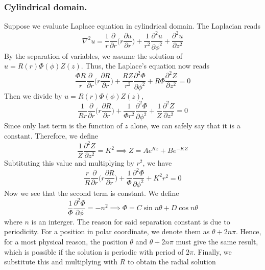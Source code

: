 \documentclass[../main.tex]{subfiles}
\begin{document}
\subsubsection*{Cylindrical domain.} Suppose we evaluate Laplace equation in cylindrical domain. The Laplacian reads
\begin{equation*}
    \nabla^2u= \frac{1}{r}\frac{\partial}{\partial r}\Biggl(r\frac{\partial u}{\partial r}\Biggr)+\frac{1}{r^2} \frac{\partial^2u}{\partial \phi^2}+ \frac{\partial^2u}{\partial z^2}
\end{equation*}
By the separation of variables, we assume the solution of $u=R(r)\Phi(\phi)Z(z)$. Thus, the Laplace's equation now reads
\begin{equation*}
    \frac{\Phi R}{r}\frac{\partial}{\partial r}\Biggl(r\frac{\partial R}{\partial r}\Biggr)
    +\frac{RZ}{r^2} \frac{\partial^2\Phi}{\partial \phi^2}
    + R\Phi\frac{\partial^2Z}{\partial z^2}=0
\end{equation*}
Then we divide by $u=R(r)\Phi(\phi)Z(z)$,
\begin{equation*}
    \frac{1}{Rr}\frac{\partial}{\partial r}\Biggl(r\frac{\partial R}{\partial r}\Biggr)
    +\frac{1}{\Phi r^2} \frac{\partial^2\Phi}{\partial \phi^2}
    + \frac{1}{Z}\frac{\partial^2Z}{\partial z^2}=0
\end{equation*}
Since only last term is the function of $z$ alone, we can safely say that it is a constant. Therefore, we define 
\begin{equation*}
    \frac{1}{Z}\frac{\partial^2Z}{\partial z^2}=K^2\implies Z=Ae^{Kz}+Be^{-KZ}
\end{equation*}
Subtituting this value and multiplying by $r^2$, we have
\begin{equation*}
    \frac{r}{R}\frac{\partial}{\partial r}\Biggl(r\frac{\partial R}{\partial r}\Biggr)
    +\frac{1}{\Phi } \frac{\partial^2\Phi}{\partial \phi^2}
    +K^2r^2=0
\end{equation*}
Now we see that the second term is constant. We define 
\begin{equation*}
    \frac{1}{\Phi}\frac{\partial^2 \Phi}{\partial \phi}=-n^2\implies \Phi=C\sin n\theta +D\cos n\theta
\end{equation*}
where $n$ is an interger. The reason for said separation constant is due to periodicity. For a position in polar coordinate, we denote them as $\theta+2n\pi$. Hence, for a most physical reason, the position $\theta$ and $\theta+2n\pi$ must give the same result, which is possible if the solution is periodic with period of $2\pi$. Finally, we substitute this and multiplying with $R$ to obtain the radial solution
\end{document}
